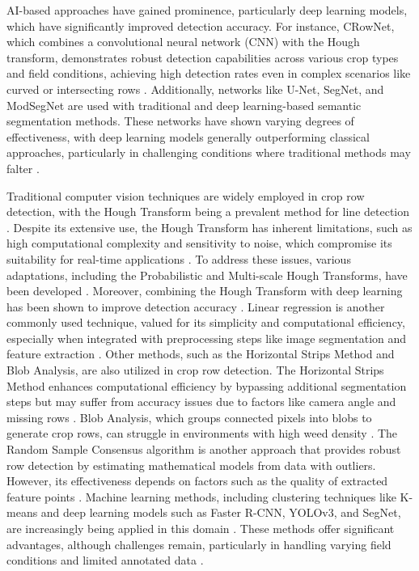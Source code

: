 \documentclass[conference]{IEEEtran}
\begin{document}
AI-based approaches have gained prominence, particularly deep learning models, which have significantly improved detection accuracy. For instance, CRowNet, which combines a convolutional neural network (CNN) with the Hough transform, demonstrates robust detection capabilities across various crop types and field conditions, achieving high detection rates even in complex scenarios like curved or intersecting rows \cite{b8,b14}. Additionally, networks like U-Net, SegNet, and ModSegNet are used with traditional and deep learning-based semantic segmentation methods. These networks have shown varying degrees of effectiveness, with deep learning models generally outperforming classical approaches, particularly in challenging conditions where traditional methods may falter \cite{b5,b13}.

Traditional computer vision techniques are widely employed in crop row detection, with the Hough Transform being a prevalent method for line detection \cite{b2,b15}. Despite its extensive use, the Hough Transform has inherent limitations, such as high computational complexity and sensitivity to noise, which compromise its suitability for real-time applications \cite{b2}. To address these issues, various adaptations, including the Probabilistic and Multi-scale Hough Transforms, have been developed \cite{b2}. Moreover, combining the Hough Transform with deep learning has been shown to improve detection accuracy \cite{b8}. Linear regression is another commonly used technique, valued for its simplicity and computational efficiency, especially when integrated with preprocessing steps like image segmentation and feature extraction \cite{b2,b3}. Other methods, such as the Horizontal Strips Method and Blob Analysis, are also utilized in crop row detection. The Horizontal Strips Method enhances computational efficiency by bypassing additional segmentation steps but may suffer from accuracy issues due to factors like camera angle and missing rows \cite{b2}. Blob Analysis, which groups connected pixels into blobs to generate crop rows, can struggle in environments with high weed density \cite{b2}. The Random Sample Consensus algorithm is another approach that provides robust row detection by estimating mathematical models from data with outliers. However, its effectiveness depends on factors such as the quality of extracted feature points \cite{b2}. Machine learning methods, including clustering techniques like K-means and deep learning models such as Faster R-CNN, YOLOv3, and SegNet, are increasingly being applied in this domain \cite{b2,b5}. These methods offer significant advantages, although challenges remain, particularly in handling varying field conditions and limited annotated data \cite{b2,b5}.
\end{document}
